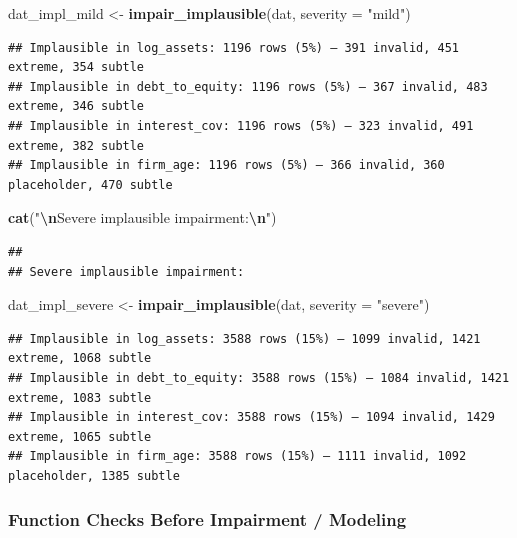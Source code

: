 \documentclass[
]{article}
\newenvironment{Shaded}{\begin{snugshade}}{\end{snugshade}}
\newcommand{\AttributeTok}[1]{\textcolor[rgb]{0.13,0.29,0.53}{#1}}
\newcommand{\FunctionTok}[1]{\textcolor[rgb]{0.13,0.29,0.53}{\textbf{#1}}}
\newcommand{\NormalTok}[1]{#1}
\newcommand{\OtherTok}[1]{\textcolor[rgb]{0.56,0.35,0.01}{#1}}
\newcommand{\SpecialCharTok}[1]{\textcolor[rgb]{0.81,0.36,0.00}{\textbf{#1}}}
\newcommand{\StringTok}[1]{\textcolor[rgb]{0.31,0.60,0.02}{#1}}
\begin{document}
\begin{Shaded}
\begin{Highlighting}[]
\NormalTok{dat\_impl\_mild   }\OtherTok{\textless{}{-}} \FunctionTok{impair\_implausible}\NormalTok{(dat, }\AttributeTok{severity =} \StringTok{"mild"}\NormalTok{)}
\end{Highlighting}
\end{Shaded}

\begin{verbatim}
## Implausible in log_assets: 1196 rows (5%) — 391 invalid, 451 extreme, 354 subtle
## Implausible in debt_to_equity: 1196 rows (5%) — 367 invalid, 483 extreme, 346 subtle
## Implausible in interest_cov: 1196 rows (5%) — 323 invalid, 491 extreme, 382 subtle
## Implausible in firm_age: 1196 rows (5%) — 366 invalid, 360 placeholder, 470 subtle
\end{verbatim}

\begin{Shaded}
\begin{Highlighting}[]
\FunctionTok{cat}\NormalTok{(}\StringTok{"}\SpecialCharTok{\textbackslash{}n}\StringTok{Severe implausible impairment:}\SpecialCharTok{\textbackslash{}n}\StringTok{"}\NormalTok{)}
\end{Highlighting}
\end{Shaded}

\begin{verbatim}
## 
## Severe implausible impairment:
\end{verbatim}

\begin{Shaded}
\begin{Highlighting}[]
\NormalTok{dat\_impl\_severe }\OtherTok{\textless{}{-}} \FunctionTok{impair\_implausible}\NormalTok{(dat, }\AttributeTok{severity =} \StringTok{"severe"}\NormalTok{)}
\end{Highlighting}
\end{Shaded}

\begin{verbatim}
## Implausible in log_assets: 3588 rows (15%) — 1099 invalid, 1421 extreme, 1068 subtle
## Implausible in debt_to_equity: 3588 rows (15%) — 1084 invalid, 1421 extreme, 1083 subtle
## Implausible in interest_cov: 3588 rows (15%) — 1094 invalid, 1429 extreme, 1065 subtle
## Implausible in firm_age: 3588 rows (15%) — 1111 invalid, 1092 placeholder, 1385 subtle
\end{verbatim}

\subsubsection{Function Checks Before Impairment /
Modeling}\label{function-checks-before-impairment-modeling}
\end{document}
